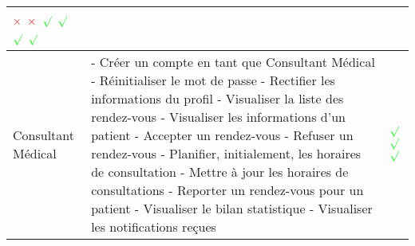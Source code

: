 \begin{table}[h]
\begin{tabular}{|m{4cm}|m{10cm}|m{2cm}|}
		\begin{math} \color{red} \times \end{math} \newline
		\begin{math} \color{red} \times \end{math} \newline
		\begin{math} \color{green} \surd \end{math} \newline
		\begin{math} \color{green} \surd \end{math} \newline
		\begin{math} \color{green} \surd \end{math} \newline
		\begin{math} \color{green} \surd \end{math} \\
		\hline
		Consultant Médical & - Créer un compte en tant que Consultant Médical \newline
		- Réinitialiser le mot de passe \newline
		- Rectifier les informations du profil \newline
		- Visualiser la liste des rendez-vous \newline
		- Visualiser les informations d’un patient \newline
		- Accepter un rendez-vous \newline
		- Refuser un rendez-vous \newline
		- Planifier, initialement, les horaires de consultation \newline
		- Mettre à jour les horaires de consultations \newline
		- Reporter un rendez-vous pour un patient \newline
		- Visualiser le bilan statistique \newline
		- Visualiser les notifications reçues &
		\begin{math} \color{green} \surd \end{math} \newline
		\begin{math} \color{green} \surd \end{math} \newline
		\begin{math} \color{green} \surd \end{math} \newline

\end{tabular}
\end{table}
